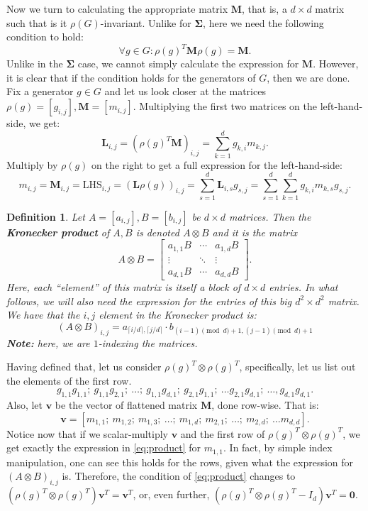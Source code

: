 \documentclass[11pt]{article}
\newtheorem{definition}[theorem]{Definition}
\begin{document}
Now we turn to calculating the appropriate matrix $\mathbf{M}$, that is, a $d\times d$
matrix such that is it $\rho(G)$-invariant.
Unlike for $\mathbf{\Sigma}$, here we need the following condition to hold:
\[\forall g \in G: \rho(g)^T\mathbf{M}\rho(g) = \mathbf{M}. \label{eq:m_require}\tag{$\dagger$}\]
Unlike in the $\mathbf{\Sigma}$ case, we cannot simply calculate the expression for $\mathbf{M}$.
However, it is clear that if the condition holds for the generators of $G$, then we are done.
Fix a generator $g \in G$ and let us look closer at the matrices $\rho(g) = [g_{i,j}], \mathbf{M} = [m_{i,j}]$.
Multiplying the first two matrices on the left-hand-side, we get:
\[\mathbf{L}_{i,j} = (\rho(g)^T\mathbf{M})_{i,j} = \sum_{k=1}^{d}g_{k,i}m_{k,j}.\]
Multiply by $\rho(g)$ on the right to get a full expression for the left-hand-side:
\[m_{i,j} = \mathbf{M}_{i,j} = \text{LHS}_{i,j} = (\mathbf{L}\rho(g))_{i,j} =
\sum_{s=1}^{d}\mathbf{L}_{i,s}g_{s,j} = \sum_{s=1}^{d}\sum_{k=1}^{d}g_{k,i}m_{k,s}g_{s,j}. \label{eq:product} \tag{$\clubsuit$}\]
\begin{definition}
  Let $A = [a_{i,j}], B = [b_{i,j}]$ be $d\times d$ matrices. Then the
  \textbf{Kronecker product} of $A, B$ is denoted $A \otimes B$ and it is the matrix
  \[A \otimes B = \begin{bmatrix} a_{1,1}B & \cdots & a_{1,d}B\\
    \vdots & \ddots & \vdots \\ a_{d,1}B & \cdots & a_{d,d}B\end{bmatrix}.\]
  \doublespacing
  Here, each ``element'' of this matrix is itself a block of $d\times d$ entries.
  In what follows, we will also need the expression for the entries of
  this big $d^2 \times d^2$ matrix. We have that the $i,j$ element in the
  Kronecker product is:
  \[(A \otimes B)_{i,j} = a_{\lceil i/d \rceil, \lceil j/d \rceil}\cdot b_{(i-1)\pmod d+1,(j-1)\pmod d+1}\]  
  \textbf{Note:} here, we are $1$-indexing the matrices.
\end{definition}
Having defined that, let us consider $\rho(g)^T \otimes \rho(g)^T$, specifically, let us list out the elements of the first row.
\[g_{1,1}g_{1,1};~g_{1,1}g_{2,1};~\ldots;~g_{1,1}g_{d,1};~g_{2,1}g_{1,1};~\ldots g_{2,1}g_{d,1};~\ldots, g_{d,1}g_{d,1}.\]
Also, let $\mathbf{v}$ be the vector of flattened matrix $\mathbf{M}$, done row-wise. That is:
\[\mathbf{v} = [m_{1,1};~ m_{1,2};~ m_{1,3};~ \ldots;~ m_{1,d};~ m_{2,1};~ \ldots;~ m_{2,d};~ \ldots m_{d,d}].\]
Notice now that if we scalar-multiply $\mathbf{v}$ and the first row of $\rho(g)^T \otimes \rho(g)^T$, we get exactly
the expression in \cref{eq:product} for $m_{1,1}$. In fact, by simple index manipulation, one
can see this holds for the rows, given what the expression for $(A \otimes B)_{i,j}$ is.
Therefore, the condition of \cref{eq:product} changes to $\left(\rho(g)^T \otimes \rho(g)^T\right)\mathbf{v}^T = \mathbf{v}^T$,
or, even further, $\left(\rho(g)^T \otimes \rho(g)^T - I_d\right)\mathbf{v}^T = \mathbf{0}$.
\end{document}
